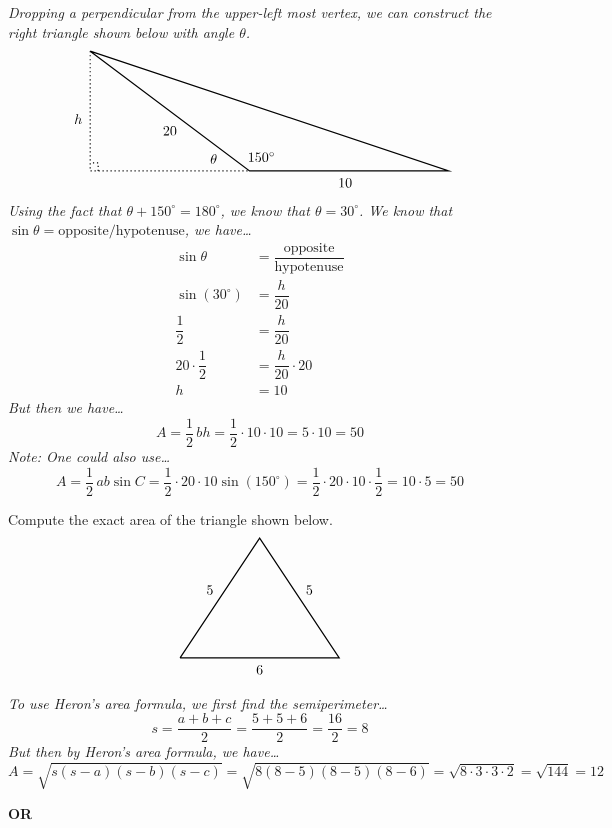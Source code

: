 \documentclass[12pt,letterpaper]{exam}
\begin{document}
\begin{questions}
{\itshape \sol Dropping a perpendicular from the upper-left most vertex, we can construct the right triangle shown below with angle $\theta$. 
	\[
	\begin{tikzpicture}
	\draw[line width=0.03cm] (-4,3) -- (0,0) -- (5,0) -- (-4,3);
	\draw[line width=0.03cm,dotted] (-4,3) -- (-4,0) -- (0,0);
	\draw[line width=0.03cm,dotted] (-3.8,0) -- (-3.8,0.2) -- (-4,0.2);
	\node at (-0.9,0.3) {$\theta$};
	\node at (-4.3,1.3) {$h$};
	\node at (0.3,0.35) {$150^\circ$};
	\node at (2.4,-0.3) {$10$};
	\node at (-2,1) {$20$};
	\end{tikzpicture}
	\]
Using the fact that $\theta + 150^\circ= 180^\circ$, we know that $\theta= 30^\circ$. We know that $\sin \theta= \text{opposite}/\text{hypotenuse}$, we have\dots
	\[
	\begin{aligned}
	\sin \theta&= \dfrac{\text{opposite}}{\text{hypotenuse}} \\[0.3cm]
	\sin \left(30^\circ \right)&= \dfrac{h}{20} \\[0.3cm]
	 \dfrac{1}{2}&= \dfrac{h}{20} \\[0.3cm]
	20 \cdot \dfrac{1}{2}&= \dfrac{h}{20} \cdot 20 \\[0.3cm]
	h&= 10
	\end{aligned}
	\]
But then we have\dots
	\[
	A= \dfrac{1}{2}\, bh= \dfrac{1}{2} \cdot 10 \cdot 10= 5 \cdot 10= 50
	\]
Note: One could also use\dots
	\[
	A= \frac{1}{2}\, ab \sin C= \frac{1}{2} \cdot 20 \cdot 10 \sin(150^\circ)= \frac{1}{2} \cdot 20 \cdot 10 \cdot \frac{1}{2}= 10 \cdot 5= 50 
	\]
}



\newpage
\question[10] Compute the exact area of the triangle shown below.
	\[
	\begin{tikzpicture}
	\draw[line width=0.03cm] (-2,0) -- (0,3) -- (2,0) -- (-2,0);
	\node at (-1.25,1.7) {$5$};
	\node at (1.25,1.7) {$5$};
	\node at (0,-0.3) {$6$};
	\end{tikzpicture}
	\] \pspace

{\itshape \sol To use Heron's area formula, we first find the semiperimeter\dots \pspace
	\[
	s= \dfrac{a + b + c}{2}= \dfrac{5 + 5 + 6}{2}= \dfrac{16}{2}= 8
	\] \pspace
But then by Heron's area formula, we have\dots \pspace
	\[
	A= \sqrt{s(s - a)(s - b)(s - c)}= \sqrt{8(8 - 5)(8 - 5)(8 - 6)}= \sqrt{8 \cdot 3 \cdot 3 \cdot 2}= \sqrt{144}= 12
	\] \pspace
	
	\begin{center} {\bfseries OR} \end{center}

}
\end{questions}
\end{document}
